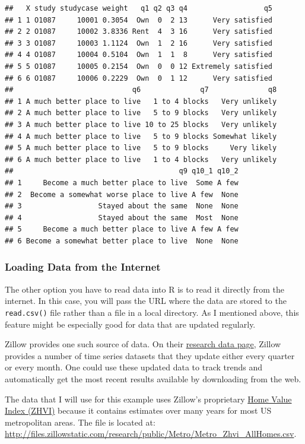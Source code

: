 \documentclass[]{article}
\begin{document}
\begin{verbatim}
##   X study studycase weight   q1 q2 q3 q4                  q5
## 1 1 O1087     10001 0.3054  Own  0  2 13      Very satisfied
## 2 2 O1087     10002 3.8336 Rent  4  3 16      Very satisfied
## 3 3 O1087     10003 1.1124  Own  1  2 16      Very satisfied
## 4 4 O1087     10004 0.5104  Own  1  1  8      Very satisfied
## 5 5 O1087     10005 0.2154  Own  0  0 12 Extremely satisfied
## 6 6 O1087     10006 0.2229  Own  0  1 12      Very satisfied
##                            q6              q7              q8
## 1 A much better place to live   1 to 4 blocks   Very unlikely
## 2 A much better place to live   5 to 9 blocks   Very unlikely
## 3 A much better place to live 10 to 25 blocks   Very unlikely
## 4 A much better place to live   5 to 9 blocks Somewhat likely
## 5 A much better place to live   5 to 9 blocks     Very likely
## 6 A much better place to live   1 to 4 blocks   Very unlikely
##                                       q9 q10_1 q10_2
## 1     Become a much better place to live  Some A few
## 2  Become a somewhat worse place to live A few  None
## 3                  Stayed about the same  None  None
## 4                  Stayed about the same  Most  None
## 5     Become a much better place to live A few A few
## 6 Become a somewhat better place to live  None  None
\end{verbatim}

\hypertarget{data_internet}{\subsubsection{Loading Data from the
Internet}\label{data_internet}}

The other option you have to read data into R is to read it directly
from the internet. In this case, you will pass the URL where the data
are stored to the \texttt{read.csv()} file rather than a file in a local
directory. As I mentioned above, this feature might be especially good
for data that are updated regularly.

Zillow provides one such source of data. On their
\href{https://www.zillow.com/research/data/}{research data page}, Zillow
provides a number of time series datasets that they update either every
quarter or every month. One could use these updated data to track trends
and automatically get the most recent results available by downloading
from the web.

The data that I will use for this example uses Zillow's proprietary
\href{https://wp.zillowstatic.com/3/ZHVI-InfoSheet-04ed2b.pdf}{Home
Value Index (ZHVI)} because it contains estimates over many years for
most US metropolitan areas. The file is located at:
\url{http://files.zillowstatic.com/research/public/Metro/Metro_Zhvi_AllHomes.csv}.
\end{document}
